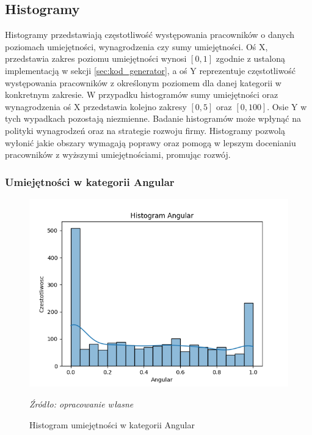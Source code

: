     \subsection{Histogramy}\label{subsec:histogramy}
    \par Histogramy przedstawiają częstotliwość występowania pracowników o danych poziomach umiejętności, wynagrodzenia czy sumy umiejętności. Oś X, przedstawia zakres poziomu umiejętności wynosi $[0, 1]$ zgodnie z ustaloną implementacją w sekcji \ref{sec:kod_generator}, a oś Y reprezentuje częstotliwość występowania pracowników z określonym poziomem dla danej kategorii w konkretnym zakresie. W przypadku histogramów sumy umiejętności oraz wynagrodzenia oś X przedstawia kolejno zakresy $[0, 5]$ oraz $[0, 100]$. Osie Y w tych wypadkach pozostają niezmienne. Badanie histogramów może wpłynąć na polityki wynagrodzeń oraz na strategie rozwoju firmy. Histogramy pozwolą wyłonić jakie obszary wymagają poprawy oraz pomogą w lepszym docenianiu pracowników z wyższymi umiejętnościami, promując rozwój.
    
        \subsubsection{Umiejętności w kategorii Angular}
        \begin{figure}[H]
            \centering
            \includegraphics[width=\linewidth]{chapters/Images/hist_angular.png}
            \cprotect\caption{Histogram umiejętności w kategorii Angular}
            \textit{Źródło: opracowanie własne} 
            \label{fig:hist_angular}
        \end{figure}

